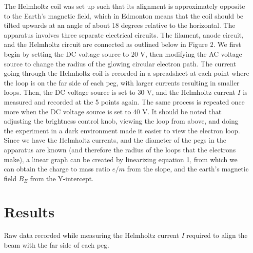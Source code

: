 \documentclass[letterpaper]{article}
\begin{document}

The Helmholtz coil was set up such that its alignment is approximately
opposite to the Earth's magnetic field, which in Edmonton means that the coil
should be tilted upwards at an angle of about 18 degrees relative to the horizontal.
The apparatus involves three separate electrical circuits.
The filament, anode circuit, and the Helmholtz circuit are connected as outlined
below in Figure 2. We first begin by setting the DC voltage source to 20 V, then modifying the
AC voltage source to change the radius of the glowing circular electron path. The current going through the
Helmholtz coil is recorded in a spreadsheet at each point where the loop is on the far side of each peg, with larger
currents resulting in smaller loops. Then,
the DC voltage source is set to 30 V, and the Helmholtz current $I$ is measured and recorded at the 5 points again.
The same process is repeated once more when the DC voltage source is set to 40 V. It should be noted
that adjusting the brightness control knob, viewing the loop from above, and doing the experiment in a dark
environment made it easier to view the electron loop.
Since we have the Helmholtz currents, and the diameter of the pegs in the apparatus are known (and therefore
the radius of the loops that the electrons make), a linear graph can be created by linearizing equation 1,
from which we can obtain the charge to mass ratio $e/m$ from the slope, and the earth's magnetic field $B_E$
from the Y-intercept.

\section{Results}

Raw data recorded while measuring the Helmholtz current \textit{I} required
to align the beam with the far side of each peg.
\end{document}

